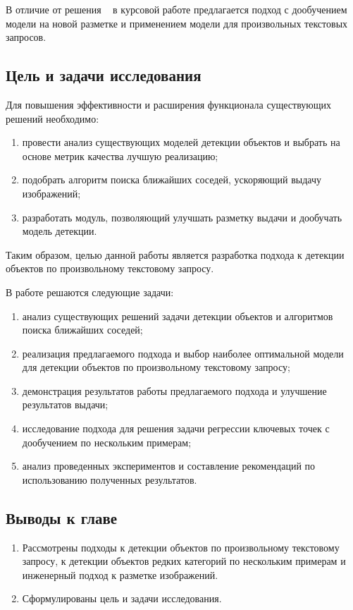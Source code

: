 \documentclass[a4paper,14pt]{article}
\begin{document}
    В отличие от решения ~\cite{AnnoMage} в курсовой работе предлагается подход с дообучением модели на новой разметке и применением модели для произвольных текстовых запросов.

    \subsection{Цель и задачи исследования}
    
    Для повышения эффективности и расширения функционала существующих решений необходимо:
    \begin{enumerate}
    	[1)]
    	\itemsep0em
    	\item провести анализ существующих моделей детекции объектов и выбрать на основе метрик качества лучшую реализацию;
    	\item подобрать алгоритм поиска ближайших соседей, ускоряющий выдачу изображений;
    	\item разработать модуль, позволяющий улучшать разметку выдачи и дообучать модель детекции.
    \end{enumerate}
    
    Таким образом, целью данной работы является разработка подхода к детекции объектов по произвольному текстовому запросу.

    В работе решаются следующие задачи:
    \begin{enumerate}
        [1)]
        \itemsep0em
        \item анализ существующих решений задачи детекции объектов и алгоритмов поиска ближайших соседей;
        \item реализация предлагаемого подхода и выбор наиболее оптимальной модели для детекции объектов по произвольному текстовому запросу;
        \item демонстрация результатов работы предлагаемого подхода и улучшение результатов выдачи;
        \item исследование подхода для решения задачи регрессии ключевых точек с дообучением по нескольким примерам;
        \item анализ проведенных экспериментов и составление рекомендаций по использованию полученных результатов.
    \end{enumerate}

    \subsection{Выводы к главе \thesection}
    \begin{enumerate}
        \itemsep0em
        \item Рассмотрены подходы к детекции объектов по произвольному текстовому запросу, к детекции объектов редких категорий по нескольким примерам и инженерный подход к разметке изображений.
        \item Сформулированы цель и задачи исследования.
    \end{enumerate}
\end{document}
